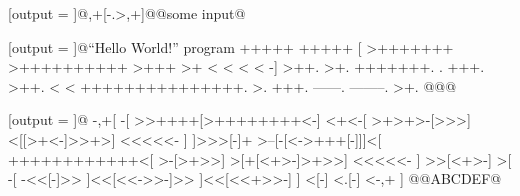 \RequirePackage{runner}
\newcommand{\result}{}

[output = \result]@,+[-.>,+]@@some input@
\typeout{\result}

[output = \result]@``Hello World!'' program
  +++++ +++++
    [ >+++++++ >++++++++++ >+++ >+ < < < < -]
  >++.
  >+.
  +++++++.
  .
  +++.
  >++.
  < < +++++++++++++++.
  >.
  +++.
  ------.
  --------.
  >+.
@@@
\typeout{\result}

[output = \result]@
  -,+[
    -[
      >>++++[>++++++++<-]
      <+<-[
        >+>+>-[>>>]
        <[[>+<-]>>+>]
        <<<<<-
      ]
    ]>>>[-]+
    >--[-[<->+++[-]]]<[
      ++++++++++++<[
        >-[>+>>]
        >[+[<+>-]>+>>]
        <<<<<-
      ]
      >>[<+>-]
      >[
        -[
          -<<[-]>>
        ]<<[<<->>-]>>
      ]<<[<<+>>-]
    ]
    <[-]
    <.[-]
    <-,+
  ]
@@ABCDEF@
\typeout{\result}

\stop